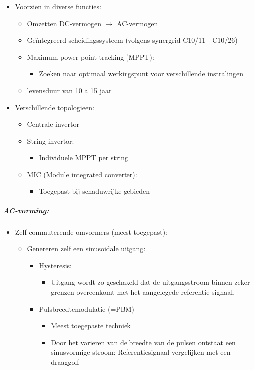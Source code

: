 \documentclass[12pt]{article}
\begin{document}
\begin{itemize}
    \item[] Voorzien in diverse functies:\begin{itemize}
        \item Omzetten DC-vermogen $\rightarrow$ AC-vermogen
        \item Geïntegreerd scheidingssysteem (volgens synergrid C10/11 - C10/26)
        \item Maximum power point tracking (MPPT):\begin{itemize}
            \item Zoeken naar optimaal werkingspunt voor verschillende instralingen
        \end{itemize}
        \item levensduur van 10 a 15 jaar
    \end{itemize}
    \item[] Verschillende topologieen:\begin{itemize}
        \item Centrale invertor
        \item String invertor:\begin{itemize}
            \item Individuele MPPT per string
        \end{itemize}
        \item MIC (Module integrated converter):\begin{itemize}
            \item Toegepast bij schaduwrijke gebieden
        \end{itemize}
    \end{itemize}
\end{itemize}
\subparagraph{AC-vorming:}
\begin{itemize}
    \item[] Zelf-commuterende omvormers (meest toegepast):\begin{itemize}
        \item Genereren zelf een sinusoidale uitgang:\begin{itemize}
            \item Hysteresis:\begin{itemize}
                \item Uitgang wordt zo geschakeld dat de uitgangsstroom binnen zeker grenzen overeenkomt met het aangelegede referentie-signaal.
            \end{itemize}
            \item Pulsbreedtemodulatie (=PBM)\begin{itemize}
                \item Meest toegepaste techniek
                \item Door het varieren van de breedte van de pulsen ontstaat een sinusvormige stroom: Referentiesignaal vergelijken met een draaggolf
            \end{itemize}
        \end{itemize}
    \end{itemize}
\end{itemize}
\end{document}
